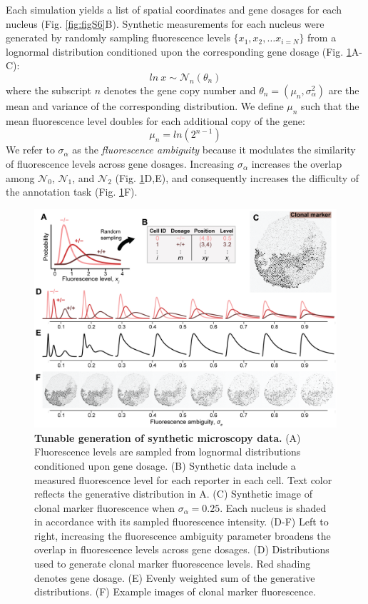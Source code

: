 Each simulation yields a list of spatial coordinates and gene dosages for each nucleus (Fig. \ref{fig:figS6}B). Synthetic measurements for each nucleus were generated by randomly sampling fluorescence levels $\{x_1, x_2, \ldots x_{i=N} \}$ from a lognormal distribution conditioned upon the corresponding gene dosage (Fig. \ref{fig:figS7}A-C):
\begin{equation}
ln\ x \sim \mathcal{N}_n(\theta _n)
\end{equation}
where the subscript $n$ denotes the gene copy number and $\theta_n = (\mu_n,\sigma_{\alpha}^2)$ are the mean and variance of the corresponding distribution. We define $\mu_n$ such that the mean fluorescence level doubles for each additional copy of the gene:
\begin{equation}
\mu_{n } = ln(2^{n-1})
\end{equation}
We refer to $\sigma_{\alpha}$ as the \emph{fluorescence ambiguity} because it modulates the similarity of fluorescence levels across gene dosages. Increasing $\sigma_{\alpha}$ increases the overlap among $\mathcal{N}_0$, $\mathcal{N}_1$, and $\mathcal{N}_2$ (Fig. \ref{fig:figS7}D,E), and consequently increases the difficulty of the annotation task (Fig. \ref{fig:figS7}F).

\begin{figure}[h]
\includegraphics[width=1.0\columnwidth]{./figure_S7}
\caption[Tunable generation of synthetic microscopy data.]{\textbf{Tunable generation of synthetic microscopy data.} (A) Fluorescence levels are sampled from lognormal distributions conditioned upon gene dosage. (B) Synthetic data include a measured fluorescence level for each reporter in each cell. Text color reflects the generative distribution in A. (C) Synthetic image of clonal marker fluorescence when $\sigma_{\alpha}=0.25$. Each nucleus is shaded in accordance with its sampled fluorescence intensity. (D-F) Left to right, increasing the fluorescence ambiguity parameter broadens the overlap in fluorescence levels across gene dosages. (D) Distributions used to generate clonal marker fluorescence levels. Red shading denotes gene dosage. (E) Evenly weighted sum of the generative distributions. (F) Example images of clonal marker fluorescence.}
\label{fig:figS7}
\end{figure}


